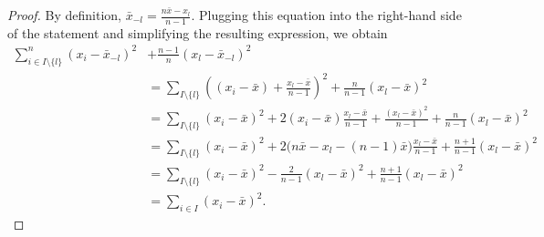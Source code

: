 \documentclass[aos]{imsart2}
\theoremstyle{plain}
\theoremstyle{definition}
\newcommand{\xbs}{\bar{x}}
\begin{document}
\begin{appendix}
\begin{proof}
	By definition, $\xbs_{-l} = \frac{n \xbs - x_l}{n-1}$. Plugging this equation into the right-hand side of the statement and simplifying the resulting expression, we obtain
{\allowdisplaybreaks
    \begin{align*}
		 \sum_{i \in I \setminus\{l\}}^n (x_i - \xbs_{-l})^2 &+ \frac{n-1}{n} (x_l - \xbs_{-l})^2\\[-2ex]
		  	&=\sum_{I \setminus\{l\}} \left((x_i-\xbs)+\frac{x_l-\xbs}{n-1}\right)^2 + \frac{n}{n-1} (x_l - \xbs)^2\\
		 &= \sum_{I \setminus\{l\}} (x_i-\xbs)^2 + 2(x_i-\xbs)\frac{x_l-\xbs}{n-1}  + \frac{(x_l - \xbs)^2}{n-1} + \frac{n}{n-1} (x_l - \xbs)^2\\
		 &= \sum_{I \setminus\{l\}} (x_i-\xbs)^2 + 2\Big(n\xbs - x_l - (n-1)\xbs\Big) \frac{x_l-\xbs}{n-1} + \frac{n+1}{n-1} (x_l - \xbs)^2\\
		 &= \sum_{I \setminus\{l\}} (x_i-\xbs)^2 - \frac{2}{n-1}(x_l-\xbs)^2+ \frac{n+1}{n-1} (x_l - \xbs)^2\\
		 &= \sum_{i\in I} (x_i-\xbs)^2.
    \end{align*}
}
\end{proof}


\end{appendix}
\end{document}
